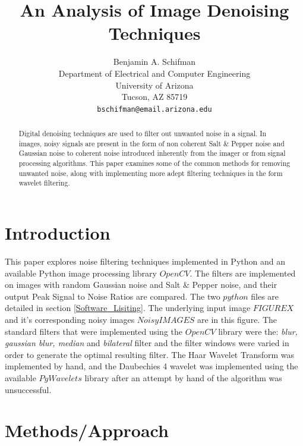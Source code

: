 \documentclass{article}
\title{An Analysis of Image Denoising Techniques}
\author{
  Benjamin A. Schifman\\
  Department of Electrical and Computer Engineering\\
  University of Arizona\\
  Tucson, AZ 85719 \\
  \texttt{bschifman@email.arizona.edu} \\
}
\begin{document}
 

\maketitle

\begin{abstract}
  Digital denoising techniques are used to filter out unwanted noise in a signal. In images, noisy signals are present in the form of non coherent Salt \& Pepper noise and Gaussian noise to coherent noise introduced inherently from the imager or from signal processing algorithms. This paper examines some of the common methods for removing unwanted noise, along with implementing more adept filtering techniques in the form wavelet filtering. 
\end{abstract}

\section{Introduction}
 This paper explores noise filtering techniques implemented in Python and an available Python image processing library $OpenCV.$ The filters are implemented on images with random Gaussian noise and Salt \& Pepper noise, and their output Peak Signal to Noise Ratios are compared. The two $python$ files are detailed in section \ref{Software_Lisiting}. The underlying input image $FIGURE X$ and it's corresponding noisy images $Noisy IMAGES$ are in this figure. The standard filters that were implemented using the $OpenCV$ library were the: \textit{blur, gaussian blur, median} and \textit{bilateral} filter and the filter windows were varied in order to generate the optimal resulting filter. The Haar Wavelet Transform was implemented by hand, and the Daubechies 4 wavelet was implemented using the available $PyWavelets$ library after an attempt by hand of the algorithm was unsuccessful.

\section{Methods/Approach}
\end{document}
